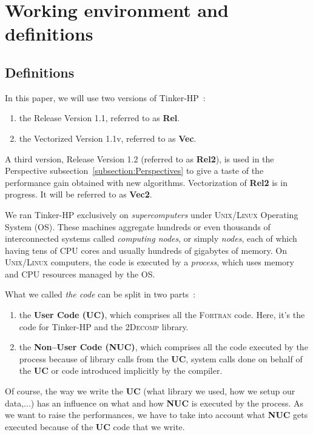 \documentclass[9pt,comparison]{livecoms}
\begin{document}
\section{Working environment and definitions}
\subsection{Definitions} 
\hspace{\parindent} In this paper, we will use two versions of Tinker-HP~: 
\begin{enumerate}
    \item the Release Version 1.1, referred to as \textbf{Rel}.
    \item the Vectorized Version 1.1v, referred to as \textbf{Vec}.
\end{enumerate}

A third version, Release Version 1.2 (referred to as \textbf{Rel2}), is used in the Perspective subsection~\ref{subsection:Perspectives} to give a taste of the performance gain obtained with new algorithms. Vectorization of \textbf{Rel2} is in progress. It will be referred to as \textbf{Vec2}. 

We ran Tinker-HP exclusively on \emph{supercomputers} under \textsc{Unix/Linux} Operating System (OS). These machines aggregate hundreds or even thousands of interconnected systems called \emph{computing nodes}, or simply \emph{nodes}, each of which having tens of CPU cores and usually hundreds of gigabytes of memory. On \textsc{Unix/Linux} computers, the code is executed by a \emph{process}, which uses memory and CPU resources managed by the OS.

What we called \emph{the code} can be split in two parts~:
\begin{enumerate}
\item the \textbf{User Code (UC)}, which comprises all the \textsc{Fortran} code. Here, it's the code for Tinker-HP and the \textsc{2Decomp} library.
\item the \textbf{Non--User Code (NUC)}, which comprises all the code executed by the process because of library calls from the \textbf{UC}, system calls done on behalf of the \textbf{UC} or code introduced implicitly by the compiler.
\end{enumerate}

Of course, the way we write the \textbf{UC} (what library we used, how we setup our data,...) has an influence on what and how \textbf{NUC} is executed by the process. As we want to raise the performances, we have to take into account what \textbf{NUC} gets executed because of the \textbf{UC} code that we write.
\end{document}
